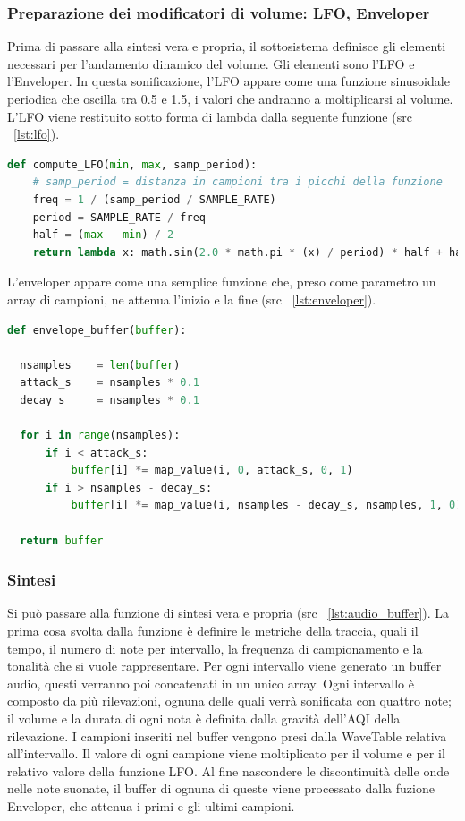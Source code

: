 \subsubsection{Preparazione dei modificatori di volume: LFO, Enveloper}
Prima di passare alla sintesi vera e propria, il sottosistema definisce gli elementi necessari per l'andamento dinamico del volume.
Gli elementi sono l'LFO e l'Enveloper.
In questa sonificazione, l'LFO appare come una funzione sinusoidale periodica che oscilla tra 0.5 e 1.5, i valori che andranno a moltiplicarsi al volume.
L'LFO viene restituito sotto forma di lambda dalla seguente funzione (src ~\ref{lst:lfo}).
\label{lst:lfo}
\begin{lstlisting}[language=Python]
def compute_LFO(min, max, samp_period): 
    # samp_period = distanza in campioni tra i picchi della funzione
    freq = 1 / (samp_period / SAMPLE_RATE)
    period = SAMPLE_RATE / freq
    half = (max - min) / 2
    return lambda x: math.sin(2.0 * math.pi * (x) / period) * half + half + min
\end{lstlisting}
L'enveloper appare come una semplice funzione che, preso come parametro un array di campioni, ne attenua l'inizio e la fine (src ~\ref{lst:enveloper}).
\label{lst:enveloper}
\begin{lstlisting}[language=Python]
def envelope_buffer(buffer):

  nsamples    = len(buffer)
  attack_s    = nsamples * 0.1
  decay_s     = nsamples * 0.1

  for i in range(nsamples):
      if i < attack_s:
          buffer[i] *= map_value(i, 0, attack_s, 0, 1)
      if i > nsamples - decay_s:
          buffer[i] *= map_value(i, nsamples - decay_s, nsamples, 1, 0)

  return buffer
\end{lstlisting}

\subsubsection{Sintesi}
Si può passare alla funzione di sintesi vera e propria (src ~\ref{lst:audio_buffer}).
La prima cosa svolta dalla funzione è definire le metriche della traccia, quali il tempo, il numero di note per intervallo, la frequenza di campionamento e la tonalità che si vuole rappresentare.
Per ogni intervallo viene generato un buffer audio, questi verranno poi concatenati in un unico array.
Ogni intervallo è composto da più rilevazioni, ognuna delle quali verrà sonificata con quattro note; il volume e la durata di ogni nota è definita dalla gravità dell'AQI della rilevazione.
I campioni inseriti nel buffer vengono presi dalla WaveTable relativa all'intervallo.
Il valore di ogni campione viene moltiplicato per il volume e per il relativo valore della funzione LFO.
Al fine nascondere le discontinuità delle onde nelle note suonate, il buffer di ognuna di queste viene processato dalla fuzione Enveloper, che attenua i primi e gli ultimi campioni.

